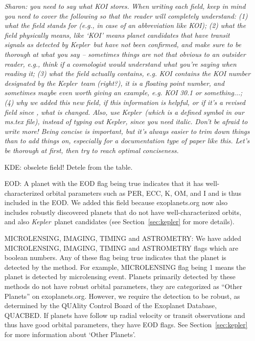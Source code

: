 \documentclass[11pt,preprint]{aastex}
\def\kepler{\textit{Kepler}}
\begin{document}
\begin{CJK*}{UTF8}{gbsn}
\textit {Sharon: you need to say what KOI stores. When writing each
  field, keep in mind you need to cover the following so that the
  reader will completely understand: (1) what the field stands for
  (e.g., in case of an abbreviation like KOI); (2) what the field
  physically means, like `KOI' means planet candidates that have transit
  signals as detected by \kepler\ but have not been confirmed, and
  make sure to be thorough at what you say -- sometimes things are not
  that obvious to an outsider reader, e.g., think if a cosmologist
  would understand what you're saying when reading it; (3) what the
  field actually contains, e.g. KOI contains the KOI number designated
  by the \kepler\ team (right?), it is a floating point number, and
  sometimes maybe even worth giving an example, e.g. KOI 30.1 or
  something...; (4) why we added this new field, if this information
  is helpful, or if it's a revised field since \cite{Wright2011}, what
  is changed. Also, use \kepler\ (which is a defined symbol in our ms.tex file),
  instead of typing out Kepler, since you need italic.
  Don't be afraid to write more! Being concise is important, but it's
  always easier to trim down things than to add things on, especially
  for a documentation type of paper like this. Let's be thorough at
  first, then try to reach optimal conciseness.}

KDE: obselete field! Detele from the table.

EOD: A planet with the EOD flag being true indicates that it has
well-characterized orbital parameters such as PER, ECC, K, OM, and I
and is thus included in the EOD. We added this field because
exoplanets.org now also includes robustly discovered planets that do
not have well-characterized orbits, and also \kepler\ planet
candidates (see Section~\ref{sec:kepler} for more details).


MICROLENSING, IMAGING, TIMING and ASTROMETRY: We have added MICROLENSING, IMAGING, TIMING and ASTROMETRY flags which are boolean numbers. Any of these flag being true indicates that the planet is detected by the method. For example, MICROLENSING flag being 1 means the planet is detected by microlensing event. Planets primarily detected
by these methods do not have robust orbital parameters, they are
categorized as ``Other Planets'' on exoplanets.org. However, we require the detection to be robust, as determined by the QUAlity Control Board of the Exoplanet Database, QUACBED. 
If planets have follow up radial velocity or transit observations and
thus have good orbital parameters, they have EOD flags. See
Section~\ref{sec:kepler} for more information about `Other Planets'. 


\end{CJK*}
\end{document}
